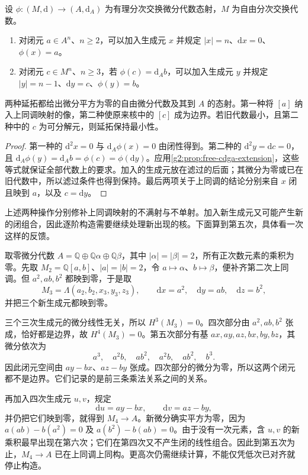 \begin{proposition}\label{g2:prop:minimal-elementary-extension}
	设 \(\phi:(M,\mathrm d)\to(A,\mathrm d_A)\) 为有理分次交换微分代数态射，\(M\) 为自由分次交换代数。
	\begin{enumerate}
		\item 对闭元 \(a\in A^n\)、\(n\ge2\)，可以加入生成元 \(x\) 并规定 \(|x|=n\)、\(\mathrm dx=0\)、\(\phi(x)=a\)。
		\item 对闭元 \(c\in M^n\)、\(n\ge3\)，若 \(\phi(c)=\mathrm d_Ab\)，可以加入生成元 \(y\) 并规定 \(|y|=n-1\)、\(\mathrm dy=c\)、\(\phi(y)=b\)。
	\end{enumerate}
	两种延拓都给出微分平方为零的自由微分代数及其到 \(A\) 的态射。第一种将 \([a]\) 纳入上同调映射的像，第二种使原来核中的 \([c]\) 成为边界。若旧代数最小，且第二种中的 \(c\) 为可分解元，则延拓保持最小性。
\end{proposition}
\begin{proof}
	第一种的 \(\mathrm d^2x=0\) 与 \(\mathrm d_A\phi(x)=0\) 由闭性得到。第二种的 \(\mathrm d^2y=\mathrm dc=0\)，且 \(\mathrm d_A\phi(y)=\mathrm d_Ab=\phi(c)=\phi(\mathrm dy)\)。应用\cref{g2:prop:free-cdga-extension}，这些等式就保证全部代数上的要求。加入的生成元放在滤过的后面；其微分为零或已在旧代数中，所以滤过条件也得到保持。最后两项关于上同调的结论分别来自 \(x\) 闭且映到 \(a\)，以及 \(c=\mathrm dy\)。
\end{proof}

上述两种操作分别修补上同调映射的不满射与不单射。加入新生成元又可能产生新的闭组合，因此逐阶构造需要继续处理新出现的核。下面算到第五次，具体看一次这样的反馈。

\begin{example}\label{g2:exm:minimal-model-low-stages}
	取零微分代数 \(A=\mathbb Q\oplus\mathbb Q\alpha\oplus\mathbb Q\beta\)，其中 \(|\alpha|=|\beta|=2\)，所有正次数元素的乘积为零。先取 \(M_2=\mathbb Q[a,b]\)、\(|a|=|b|=2\)，令 \(a\mapsto\alpha\)、\(b\mapsto\beta\)，便补齐第二次上同调。但 \(a^2,ab,b^2\) 都映到零，于是取
	\[
		M_3=\Lambda(a_2,b_2,x_3,y_3,z_3),\qquad
		\mathrm dx=a^2,\quad \mathrm dy=ab,\quad \mathrm dz=b^2,
	\]
	并把三个新生成元都映到零。

	三个三次生成元的微分线性无关，所以 \(H^3(M_3)=0\)。四次部分由 \(a^2,ab,b^2\) 张成，恰好都是边界，故 \(H^4(M_3)=0\)。第五次部分有基 \(ax,ay,az,bx,by,bz\)，其微分依次为
	\[
		a^3,\quad a^2b,\quad ab^2,\quad a^2b,\quad ab^2,\quad b^3.
	\]
	因此闭元空间由 \(ay-bx\)、\(az-by\) 张成。四次部分的微分为零，所以这两个闭元都不是边界。它们记录的是前三条乘法关系之间的关系。

	再加入四次生成元 \(u,v\)，规定
	\[
		\mathrm du=ay-bx,\qquad \mathrm dv=az-by,
	\]
	并仍把它们映到零，就得到 \(M_4\to A\)。新微分确实平方为零，因为 \(a(ab)-b(a^2)=0\) 及 \(a(b^2)-b(ab)=0\)。由于没有一次元素，含 \(u,v\) 的新乘积最早出现在第六次；它们在第四次又不产生闭的线性组合。因此到第五次为止，\(M_4\to A\) 已在上同调上同构。更高次仍需继续计算，不能仅凭低次已对齐就停止构造。
\end{example}

